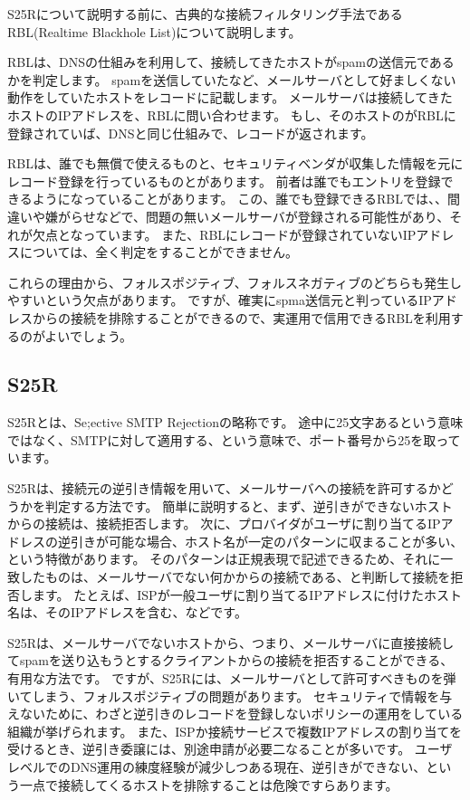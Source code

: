 S25Rについて説明する前に、古典的な接続フィルタリング手法であるRBL(Realtime Blackhole List)について説明します。

RBLは、DNSの仕組みを利用して、接続してきたホストがspamの送信元であるかを判定します。
spamを送信していたなど、メールサーバとして好ましくない動作をしていたホストをレコードに記載します。
メールサーバは接続してきたホストのIPアドレスを、RBLに問い合わせます。
もし、そのホストのがRBLに登録されていば、DNSと同じ仕組みで、レコードが返されます。

RBLは、誰でも無償で使えるものと、セキュリティベンダが収集した情報を元にレコード登録を行っているものとがあります。
前者は誰でもエントリを登録できるようになっていることがあります。
この、誰でも登録できるRBLでは、、間違いや嫌がらせなどで、問題の無いメールサーバが登録される可能性があり、それが欠点となっています。
また、RBLにレコードが登録されていないIPアドレスについては、全く判定をすることができません。

これらの理由から、フォルスポジティブ、フォルスネガティブのどちらも発生しやすいという欠点があります。
ですが、確実にspma送信元と判っているIPアドレスからの接続を排除することができるので、実運用で信用できるRBLを利用するのがよいでしょう。

\subsection{S25R}

S25Rとは、Se;ective SMTP Rejectionの略称です。
途中に25文字あるという意味ではなく、SMTPに対して適用する、という意味で、ポート番号から25を取っています。

S25Rは、接続元の逆引き情報を用いて、メールサーバへの接続を許可するかどうかを判定する方法です。
簡単に説明すると、まず、逆引きができないホストからの接続は、接続拒否します。
次に、プロバイダがユーザに割り当てるIPアドレスの逆引きが可能な場合、ホスト名が一定のパターンに収まることが多い、という特徴があります。
そのパターンは正規表現で記述できるため、それに一致したものは、メールサーバでない何かからの接続である、と判断して接続を拒否します。
たとえば、ISPが一般ユーザに割り当てるIPアドレスに付けたホスト名は、そのIPアドレスを含む、などです。

S25Rは、メールサーバでないホストから、つまり、メールサーバに直接接続してspamを送り込もうとするクライアントからの接続を拒否することができる、有用な方法です。
ですが、S25Rには、メールサーバとして許可すべきものを弾いてしまう、フォルスポジティブの問題があります。
セキュリティで情報を与えないために、わざと逆引きのレコードを登録しないポリシーの運用をしている組織が挙げられます。
また、ISPか接続サービスで複数IPアドレスの割り当てを受けるとき、逆引き委譲には、別途申請が必要二なることが多いです。
ユーザレベルでのDNS運用の練度経験が減少しつある現在、逆引きができない、という一点で接続してくるホストを排除することは危険ですらあります。

